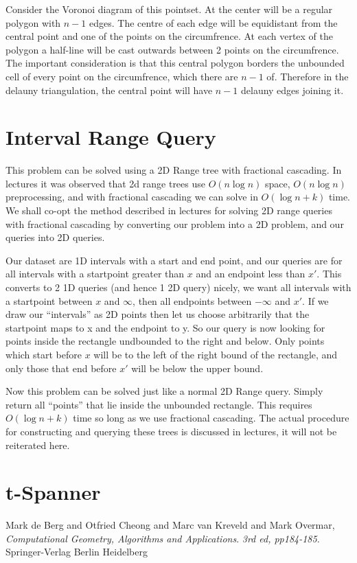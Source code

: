 \documentclass{article}
\begin{document}
Consider the Voronoi diagram of this pointset.
At the center will be a regular polygon with $n-1$ edges.
The centre of each edge will be equidistant from the central point and one of the points on the circumfrence.
At each vertex of the polygon a half-line will be cast outwards between 2 points on the circumfrence.
The important consideration is that this central polygon borders the unbounded cell of every point on the circumfrence, which there are $n-1$ of.
Therefore in the delauny triangulation, the central point will have $n-1$ delauny edges joining it.

\section {Interval Range Query}

This problem can be solved using a 2D Range tree with fractional cascading.
In lectures it was observed that 2d range trees use $O(n \log n)$ space, $O(n \log n)$ preprocessing, and with fractional cascading we can solve in $O(\log n + k)$ time.
We shall co-opt the method described in lectures for solving 2D range queries with fractional cascading by converting our problem into a 2D problem, and our queries into 2D queries.

Our dataset are 1D intervals with a start and end point, and our queries are for all intervals with a startpoint greater than $x$ and an endpoint less than $x'$.
This converts to 2 1D queries (and hence 1 2D query) nicely, we want all intervals with a startpoint between $x$ and $\infty$, then all endpoints between $-\infty$ and $x'$.
If we draw our ``intervals'' as 2D points then let us choose arbitrarily that the startpoint maps to x and the endpoint to y.
So our query is now looking for points inside the rectangle undbounded to the right and below.
Only points which start before $x$ will be to the left of the right bound of the rectangle, and only those that end before $x'$ will be below the upper bound.

Now this problem can be solved just like a normal 2D Range query.
Simply return all ``points'' that lie inside the unbounded rectangle.
This requires $O(\log n + k)$ time so long as we use fractional cascading.
The actual procedure for constructing and querying these trees is discussed in lectures, it will not be reiterated here.

\section {t-Spanner}

\begin{thebibliography}{9}

	Mark de Berg and Otfried Cheong and Marc van Kreveld and Mark Overmar,
	\emph{Computational Geometry, Algorithms and Applications}.
	\emph{3rd ed, pp184-185}.
	Springer-Verlag Berlin Heidelberg
\end{thebibliography}
\end{document}
